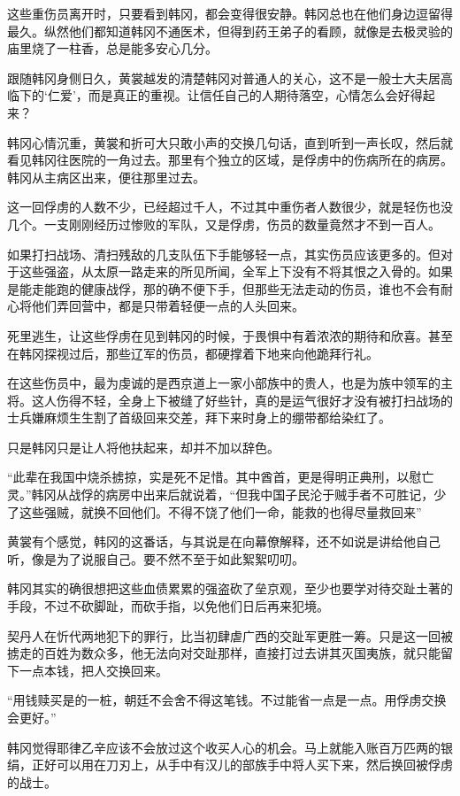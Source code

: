 这些重伤员离开时，只要看到韩冈，都会变得很安静。韩冈总也在他们身边逗留得最久。纵然他们都知道韩冈不通医术，但得到药王弟子的看顾，就像是去极灵验的庙里烧了一柱香，总是能多安心几分。

跟随韩冈身侧日久，黄裳越发的清楚韩冈对普通人的关心，这不是一般士大夫居高临下的‘仁爱’，而是真正的重视。让信任自己的人期待落空，心情怎么会好得起来？

韩冈心情沉重，黄裳和折可大只敢小声的交换几句话，直到听到一声长叹，然后就看见韩冈往医院的一角过去。那里有个独立的区域，是俘虏中的伤病所在的病房。韩冈从主病区出来，便往那里过去。

这一回俘虏的人数不少，已经超过千人，不过其中重伤者人数很少，就是轻伤也没几个。一支刚刚经历过惨败的军队，又是俘虏，伤员的数量竟然才不到一百人。

如果打扫战场、清扫残敌的几支队伍下手能够轻一点，其实伤员应该更多的。但对于这些强盗，从太原一路走来的所见所闻，全军上下没有不将其恨之入骨的。如果是能走能跑的健康战俘，那的确不便下手，但那些无法走动的伤员，谁也不会有耐心将他们弄回营中，都是只带着轻便一点的人头回来。

死里逃生，让这些俘虏在见到韩冈的时候，于畏惧中有着浓浓的期待和欣喜。甚至在韩冈探视过后，那些辽军的伤员，都硬撑着下地来向他跪拜行礼。

在这些伤员中，最为虔诚的是西京道上一家小部族中的贵人，也是为族中领军的主将。这人伤得不轻，全身上下被缝了好些针，真的是运气很好才没有被打扫战场的士兵嫌麻烦生生割了首级回来交差，拜下来时身上的绷带都给染红了。


只是韩冈只是让人将他扶起来，却并不加以辞色。

“此辈在我国中烧杀掳掠，实是死不足惜。其中酋首，更是得明正典刑，以慰亡灵。”韩冈从战俘的病房中出来后就说着，“但我中国子民沦于贼手者不可胜记，少了这些强贼，就换不回他们。不得不饶了他们一命，能救的也得尽量救回来”

黄裳有个感觉，韩冈的这番话，与其说是在向幕僚解释，还不如说是讲给他自己听，像是为了说服自己。要不然不至于如此絮絮叨叨。

韩冈其实的确很想把这些血债累累的强盗砍了垒京观，至少也要学对待交趾土著的手段，不过不砍脚趾，而砍手指，以免他们日后再来犯境。

契丹人在忻代两地犯下的罪行，比当初肆虐广西的交趾军更胜一筹。只是这一回被掳走的百姓为数众多，他无法向对交趾那样，直接打过去讲其灭国夷族，就只能留下一点本钱，把人交换回来。

“用钱赎买是的一桩，朝廷不会舍不得这笔钱。不过能省一点是一点。用俘虏交换会更好。”

韩冈觉得耶律乙辛应该不会放过这个收买人心的机会。马上就能入账百万匹两的银绢，正好可以用在刀刃上，从手中有汉儿的部族手中将人买下来，然后换回被俘虏的战士。

